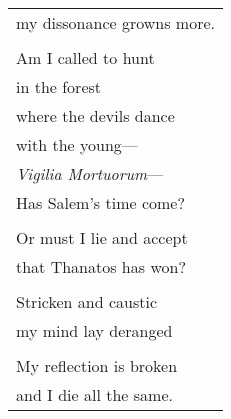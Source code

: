 \documentclass{article}
\begin{document}
\begin{center}
\begin{tabular}{l}
my dissonance growns more. \\
\\
Am I called to hunt  \\
in the forest \\
where the devils dance \\
with the young--- \\
\textit{Vigilia Mortuorum}--- \\ %
Has Salem's time come? \\
\\
Or must I lie and accept \\
that Thanatos has won? \\
\\
Stricken and caustic \\
my mind lay deranged \\
\\
My reflection is broken \\
and I die all the same. \\
\end{tabular}
\end{center}
\end{document}
